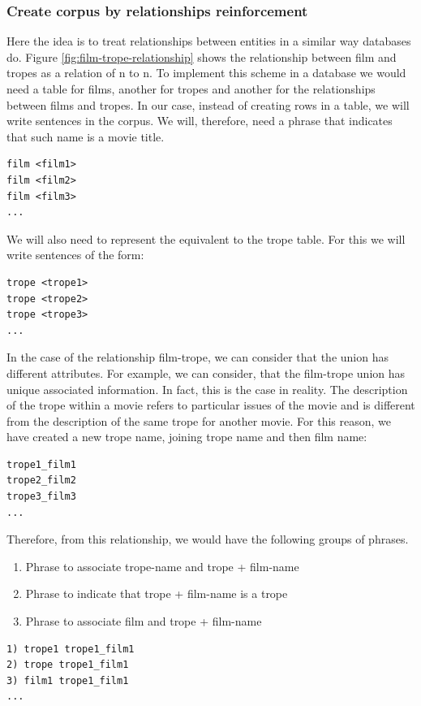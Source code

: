\documentclass[letterpaper]{article}
\begin{document}
   \subsubsection{Create corpus by relationships reinforcement}

Here the idea is to treat relationships between entities in a similar way databases do. Figure \ref{fig:film-trope-relationship} shows the relationship between film and tropes as a relation of n to n. To implement this scheme in a database we would need a table for films, another for tropes and another for the relationships between films and tropes. In our case, instead of creating rows in a table, we will write sentences in the corpus. We will, therefore, need a phrase that indicates that such
name is a movie title.

\begin{verbatim}
film <film1>
film <film2>
film <film3>
...
\end{verbatim}

We will also need to represent the equivalent to the trope table. For this we will write sentences of the form:
\begin{verbatim}
trope <trope1>
trope <trope2>
trope <trope3>
...
\end{verbatim}

In the case of the relationship film-trope, we can consider that the union has different attributes. For example, we can consider, that the film-trope union has unique associated information.  In fact, this is the case in reality. The description of the trope within a movie refers to particular issues of the movie and is different from the description of the same trope for another movie. For this reason, we have created a new trope name, joining trope name and then film name:
\begin{verbatim}
trope1_film1
trope2_film2
trope3_film3
...        
\end{verbatim}

Therefore, from this relationship, we would have the following groups of phrases.
\begin{enumerate}
\item Phrase to associate trope-name and trope + film-name
\item Phrase to indicate that trope + film-name is a trope
\item Phrase to associate film and trope + film-name 
\end{enumerate}     

\begin{verbatim}
1) trope1 trope1_film1
2) trope trope1_film1
3) film1 trope1_film1
...        
\end{verbatim}
\end{document}
